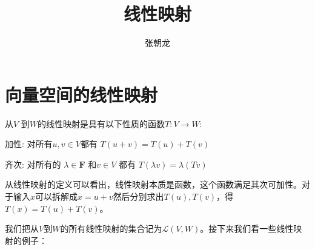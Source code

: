 \documentclass[10pt,a4paper,UTF8]{article}
\author{张朝龙}
\date{}
\title{线性映射}
\begin{document}
\maketitle
\tableofcontents
{}
\newpage



\section{向量空间的线性映射}
\label{sec:org500e39c}


\begin{definition}
从\(V\) 到\(W\)的线性映射是具有以下性质的函数\(T: V \rightarrow W\):

加性: 对所有\(u,v \in V\)都有 \(T(u+v) = T(u) + T(v)\)

齐次: 对所有的 \(\lambda \in \mathbf{F}\) 和\(v\in V\) 都有 \(T(\lambda v) = \lambda (Tv)\)
\end{definition}

从线性映射的定义可以看出，线性映射本质是函数，这个函数满足其次可加性。对于输入\(x\)可以拆解成\(x=u+v\)然后分别求出\(T(u),T(v)\)，得\(T(x)=T(u)+T(v)\)。

我们把从\(V\)到\(W\)的所有线性映射的集合记为\(\mathcal{L}(V,W)\)。接下来我们看一些线性映射的例子：
\end{document}

